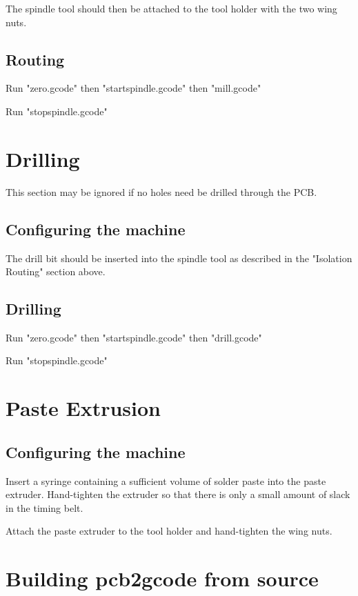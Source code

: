 \documentclass[a4paper,11pt]{article}  %
\begin{document}
The spindle tool should then be attached to the tool holder with the two
wing nuts.

\subsection{Routing}
Run "zero.gcode" then "startspindle.gcode" then "mill.gcode"

Run "stopspindle.gcode"

\section{Drilling}
This section may be ignored if no holes need be drilled through the PCB.

\subsection{Configuring the machine}
The drill bit should be inserted into the spindle tool as described in 
the "Isolation Routing" section above.

\subsection{Drilling}
Run "zero.gcode" then "startspindle.gcode" then "drill.gcode"

Run "stopspindle.gcode"

\section{Paste Extrusion}

\subsection{Configuring the machine}
Insert a syringe containing a sufficient volume of solder paste into
the paste extruder. Hand-tighten the extruder so that there is only a 
small amount of slack in the timing belt.

Attach the paste extruder to the tool holder and hand-tighten the wing 
nuts.




\newpage

\section{Building pcb2gcode from source}
\label{sec:buildpcb2gcode}
\end{document}
